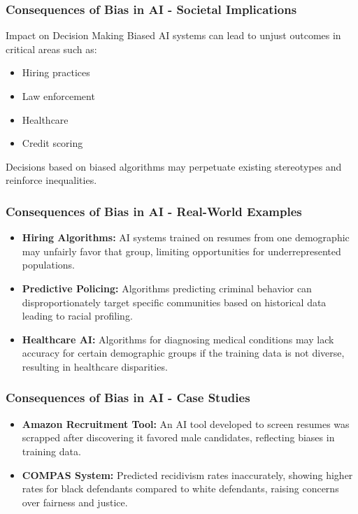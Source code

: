 \documentclass[aspectratio=169]{beamer}
\begin{document}
\begin{frame}[fragile]
    \frametitle{Consequences of Bias in AI - Societal Implications}
    \begin{block}{Impact on Decision Making}
        Biased AI systems can lead to unjust outcomes in critical areas such as:
        \begin{itemize}
            \item Hiring practices
            \item Law enforcement
            \item Healthcare
            \item Credit scoring
        \end{itemize}
        Decisions based on biased algorithms may perpetuate existing stereotypes and reinforce inequalities.
    \end{block}
\end{frame}

\begin{frame}[fragile]
    \frametitle{Consequences of Bias in AI - Real-World Examples}
    \begin{itemize}
        \item \textbf{Hiring Algorithms:} AI systems trained on resumes from one demographic may unfairly favor that group, limiting opportunities for underrepresented populations.
        
        \item \textbf{Predictive Policing:} Algorithms predicting criminal behavior can disproportionately target specific communities based on historical data leading to racial profiling.
        
        \item \textbf{Healthcare AI:} Algorithms for diagnosing medical conditions may lack accuracy for certain demographic groups if the training data is not diverse, resulting in healthcare disparities.
    \end{itemize}
\end{frame}

\begin{frame}[fragile]
    \frametitle{Consequences of Bias in AI - Case Studies}
    \begin{itemize}
        \item \textbf{Amazon Recruitment Tool:} An AI tool developed to screen resumes was scrapped after discovering it favored male candidates, reflecting biases in training data.
        
        \item \textbf{COMPAS System:} Predicted recidivism rates inaccurately, showing higher rates for black defendants compared to white defendants, raising concerns over fairness and justice.
    \end{itemize}
\end{frame}
\end{document}

